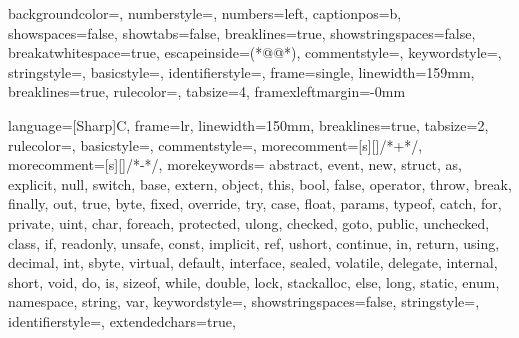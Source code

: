  {
backgroundcolor=\color{backgroundcolour},
numberstyle=\color{gray},
numbers=left, 
captionpos=b,
showspaces=false,
showtabs=false,
breaklines=true,
showstringspaces=false,
breakatwhitespace=true,
escapeinside={(*@}{@*)},
commentstyle=\color{greencomments},
keywordstyle=\color{keywordcolor},
stringstyle=\color{redstrings},
basicstyle=\ttfamily\small,
identifierstyle=\color{sblue},
frame=single,
linewidth=159mm,
breaklines=true,
rulecolor=\color{black!40},
tabsize=4,
framexleftmargin=-0mm
}

\newcommand\digitstyle{\color{smagenta}}
\newcommand\symbolstyle{\color{base01}}
 {
  language=[Sharp]C,
  frame=lr,
  linewidth=150mm,
  breaklines=true,
  tabsize=2,
  rulecolor=\color{base2},
  basicstyle=\footnotesize\ttfamily,
  commentstyle=\color{base01},
  morecomment=[s][\color{base01}]{/*+}{*/},
  morecomment=[s][\color{base01}]{/*-}{*/},
  morekeywords={  abstract, event, new, struct,
                as, explicit, null, switch,
                base, extern, object, this,
                bool, false, operator, throw,
                break, finally, out, true,
                byte, fixed, override, try,
                case, float, params, typeof,
                catch, for, private, uint,
                char, foreach, protected, ulong,
                checked, goto, public, unchecked,
                class, if, readonly, unsafe,
                const, implicit, ref, ushort,
                continue, in, return, using,
                decimal, int, sbyte, virtual,
                default, interface, sealed, volatile,
                delegate, internal, short, void,
                do, is, sizeof, while,
                double, lock, stackalloc,
                else, long, static,
                enum, namespace, string, var},
  keywordstyle=\color{sgreen},
  showstringspaces=false,
  stringstyle=\color{scyan},
  identifierstyle=\color{sblue},
  extendedchars=true,
}

